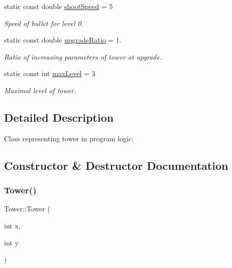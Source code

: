 \begin{DoxyCompactItemize}
\mbox{\label{class_tower_a1432839ae641b6dce99714c537a468fb}} 
static const double \mbox{\hyperlink{class_tower_a1432839ae641b6dce99714c537a468fb}{shoot\+Speed}} = 5
\begin{DoxyCompactList}\small\item\em Speed of bullet for level 0. \end{DoxyCompactList}\item 
\mbox{\label{class_tower_a96e8819718e60f26498a9013a4a63238}} 
static const double \mbox{\hyperlink{class_tower_a96e8819718e60f26498a9013a4a63238}{upgrade\+Ratio}} = 1.
\begin{DoxyCompactList}\small\item\em Ratio of increasing parameters of tower at upgrade. \end{DoxyCompactList}\item 
\mbox{\label{class_tower_a96f87c25354d6b919e517788e1e46539}} 
static const int \mbox{\hyperlink{class_tower_a96f87c25354d6b919e517788e1e46539}{max\+Level}} = 3
\begin{DoxyCompactList}\small\item\em Maximal level of tower. \end{DoxyCompactList}\end{DoxyCompactItemize}


\subsection{Detailed Description}
Class representing tower in program logic. 

\subsection{Constructor \& Destructor Documentation}
\mbox{\label{class_tower_a330b70ccd30f0964eab8c905fe25fdcf}} 
\subsubsection{\texorpdfstring{Tower()}{Tower()}\hspace{0.1cm}{\footnotesize\ttfamily [1/2]}}
{\footnotesize\ttfamily Tower\+::\+Tower (\begin{DoxyParamCaption}\item[{int}]{x,  }\item[{int}]{y }\end{DoxyParamCaption})}



